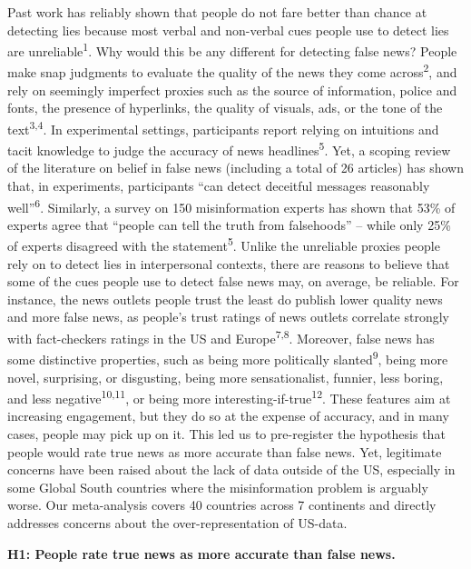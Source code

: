 \documentclass[
  doc,floatsintext]{apa6}
\begin{document}
Past work has reliably shown that people do not fare better than chance at detecting lies because most verbal and non-verbal cues people use to detect lies are unreliable\textsuperscript{1}. Why would this be any different for detecting false news? People make snap judgments to evaluate the quality of the news they come across\textsuperscript{2}, and rely on seemingly imperfect proxies such as the source of information, police and fonts, the presence of hyperlinks, the quality of visuals, ads, or the tone of the text\textsuperscript{3,4}. In experimental settings, participants report relying on intuitions and tacit knowledge to judge the accuracy of news headlines\textsuperscript{5}. Yet, a scoping review of the literature on belief in false news (including a total of 26 articles) has shown that, in experiments, participants ``can detect deceitful messages reasonably well''\textsuperscript{6}. Similarly, a survey on 150 misinformation experts has shown that 53\% of experts agree that ``people can tell the truth from falsehoods'' -- while only 25\% of experts disagreed with the statement\textsuperscript{5}. Unlike the unreliable proxies people rely on to detect lies in interpersonal contexts, there are reasons to believe that some of the cues people use to detect false news may, on average, be reliable. For instance, the news outlets people trust the least do publish lower quality news and more false news, as people's trust ratings of news outlets correlate strongly with fact-checkers ratings in the US and Europe\textsuperscript{7,8}. Moreover, false news has some distinctive properties, such as being more politically slanted\textsuperscript{9}, being more novel, surprising, or disgusting, being more sensationalist, funnier, less boring, and less negative\textsuperscript{10,11}, or being more interesting-if-true\textsuperscript{12}. These features aim at increasing engagement, but they do so at the expense of accuracy, and in many cases, people may pick up on it. This led us to pre-register the hypothesis that people would rate true news as more accurate than false news. Yet, legitimate concerns have been raised about the lack of data outside of the US, especially in some Global South countries where the misinformation problem is arguably worse. Our meta-analysis covers 40 countries across 7 continents and directly addresses concerns about the over-representation of US-data.

\textbf{H1: People rate true news as more accurate than false news.}
\end{document}
